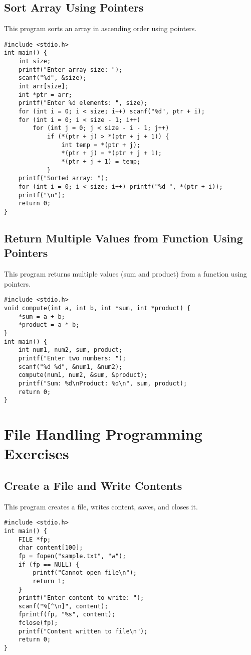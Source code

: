 \documentclass[a4paper,12pt]{article}
\begin{document}
\subsection{Sort Array Using Pointers}
This program sorts an array in ascending order using pointers.
\begin{lstlisting}[caption={Sort Array Using Pointers}]
#include <stdio.h>
int main() {
    int size;
    printf("Enter array size: ");
    scanf("%d", &size);
    int arr[size];
    int *ptr = arr;
    printf("Enter %d elements: ", size);
    for (int i = 0; i < size; i++) scanf("%d", ptr + i);
    for (int i = 0; i < size - 1; i++)
        for (int j = 0; j < size - i - 1; j++)
            if (*(ptr + j) > *(ptr + j + 1)) {
                int temp = *(ptr + j);
                *(ptr + j) = *(ptr + j + 1);
                *(ptr + j + 1) = temp;
            }
    printf("Sorted array: ");
    for (int i = 0; i < size; i++) printf("%d ", *(ptr + i));
    printf("\n");
    return 0;
}
\end{lstlisting}
\clearpage

\subsection{Return Multiple Values from Function Using Pointers}
This program returns multiple values (sum and product) from a function using pointers.
\begin{lstlisting}[caption={Return Multiple Values from Function Using Pointers}]
#include <stdio.h>
void compute(int a, int b, int *sum, int *product) {
    *sum = a + b;
    *product = a * b;
}
int main() {
    int num1, num2, sum, product;
    printf("Enter two numbers: ");
    scanf("%d %d", &num1, &num2);
    compute(num1, num2, &sum, &product);
    printf("Sum: %d\nProduct: %d\n", sum, product);
    return 0;
}
\end{lstlisting}
\clearpage

\section{File Handling Programming Exercises}

\subsection{Create a File and Write Contents}
This program creates a file, writes content, saves, and closes it.
\begin{lstlisting}[caption={Create a File and Write Contents}]
#include <stdio.h>
int main() {
    FILE *fp;
    char content[100];
    fp = fopen("sample.txt", "w");
    if (fp == NULL) {
        printf("Cannot open file\n");
        return 1;
    }
    printf("Enter content to write: ");
    scanf("%[^\n]", content);
    fprintf(fp, "%s", content);
    fclose(fp);
    printf("Content written to file\n");
    return 0;
}
\end{lstlisting}
\clearpage
\end{document}
